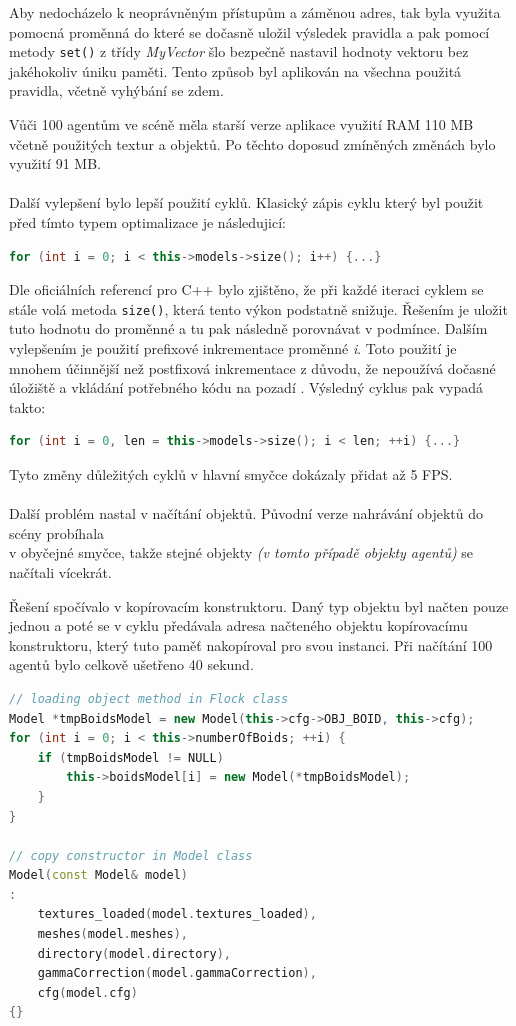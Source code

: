 \documentclass[czech,public,dept460,male,cpdeclaration]{diploma}
\begin{document}
Aby nedocházelo k neoprávněným přístupům a záměnou adres, tak byla využita pomocná proměnná do které se dočasně uložil výsledek pravidla a pak pomocí metody \texttt{set()} z třídy \textit{MyVector} šlo bezpečně nastavil hodnoty vektoru bez jakéhokoliv úniku paměti. Tento způsob byl aplikován na všechna použitá pravidla, včetně vyhýbání se zdem.

Vůči 100 agentům ve scéně měla starší verze aplikace využití RAM 110 MB včetně použitých textur a objektů. Po těchto doposud zmíněných změnách bylo využití 91 MB.
\\\\
Další vylepšení bylo lepší použití cyklů. Klasický zápis cyklu který byl použit před tímto typem optimalizace je následujicí:
\begin{lstlisting}[language=c++,label=src:classic cycle,caption=Použití klasického cyklu] 
for (int i = 0; i < this->models->size(); i++) {...}
\end{lstlisting}
Dle oficiálních referencí pro C++ \cite{linkToCppReference} bylo zjištěno, že při každé iteraci cyklem se stále volá metoda \texttt{size()}, která tento výkon podstatně snižuje. Řešením je uložit tuto hodnotu do proměnné a tu pak  následně porovnávat v podmínce. Dalším vylepšením je použití prefixové inkrementace proměnné \textit{i}. Toto použití je mnohem účinnější než postfixová inkrementace z důvodu, že nepoužívá dočasné úložiště a vkládání potřebného kódu na pozadí \cite{linkToPreIncrementation}. Výsledný cyklus pak vypadá takto:
\begin{lstlisting}[language=c++,label=src:optimalized cycle,caption=Použití optimalizovaného cyklu] 
for (int i = 0, len = this->models->size(); i < len; ++i) {...}
\end{lstlisting}

Tyto změny důležitých cyklů v hlavní smyčce dokázaly přidat až 5 FPS.
\\\\
Další problém nastal v načítání objektů. Původní verze nahrávání objektů do scény probíhala\\ v obyčejné smyčce, takže stejné objekty \textit{(v tomto případě objekty agentů)} se načítali vícekrát. 

Řešení spočívalo v kopírovacím konstruktoru. Daný typ objektu byl načten pouze jednou a poté se v cyklu předávala adresa načteného objektu kopírovacímu konstruktoru, který tuto paměť nakopíroval pro svou instanci. Při načítání 100 agentů bylo celkově ušetřeno 40 sekund.

\begin{lstlisting}[language=c++,label=src:copy constructor,caption=Ukázka použití kopírovacího konstruktoru]
// loading object method in Flock class
Model *tmpBoidsModel = new Model(this->cfg->OBJ_BOID, this->cfg);
for (int i = 0; i < this->numberOfBoids; ++i) {
	if (tmpBoidsModel != NULL)
		this->boidsModel[i] = new Model(*tmpBoidsModel);
	}
}

// copy constructor in Model class
Model(const Model& model) 
: 
	textures_loaded(model.textures_loaded),
	meshes(model.meshes),
	directory(model.directory),
	gammaCorrection(model.gammaCorrection),
	cfg(model.cfg)
{}
\end{lstlisting}
\end{document}
